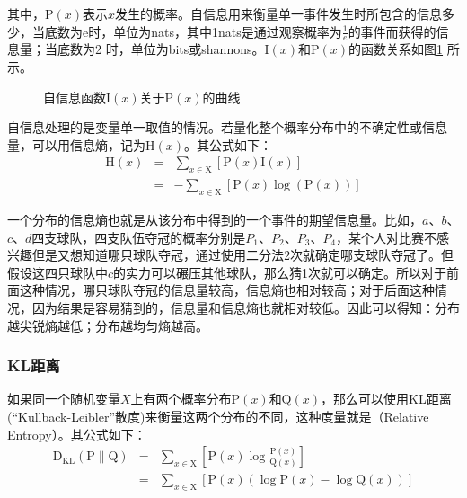 \noindent 其中，$\textrm{P}(x)$表示$x$发生的概率。自信息用来衡量单一事件发生时所包含的信息多少，当底数为e时，单位为nats，其中1nats是通过观察概率为$\frac{1}{e}$的事件而获得的信息量；当底数为2 时，单位为bits或shannons。$\textrm{I}(x)$和$\textrm{P}(x)$的函数关系如图\ref{fig:2-6} 所示。

\begin{figure}[htp]
\centering

\caption{自信息函数$\textrm{I}(x)$关于$\textrm{P}(x)$的曲线}
\label{fig:2-6}
\end{figure}

\parinterval 自信息处理的是变量单一取值的情况。若量化整个概率分布中的不确定性或信息量，可以用信息熵，记为$\textrm{H}(x)$。其公式如下：
\begin{eqnarray}
\textrm{H}(x) & = & \sum_{x \in \textrm{X}}[ \textrm{P}(x) \textrm{I}(x)] \nonumber \\
              & = & - \sum_{x \in \textrm{X} } [\textrm{P}(x)\log(\textrm{P}(x)) ]
\label{eq:2-14}
\end{eqnarray}

\parinterval 一个分布的信息熵也就是从该分布中得到的一个事件的期望信息量。比如，$a$、$b$、$c$、$d$四支球队，四支队伍夺冠的概率分别是$P_1$、$P_2$、$P_3$、$P_4$，某个人对比赛不感兴趣但是又想知道哪只球队夺冠，通过使用二分法2次就确定哪支球队夺冠了。但假设这四只球队中$c$的实力可以碾压其他球队，那么猜1次就可以确定。所以对于前面这种情况，哪只球队夺冠的信息量较高，信息熵也相对较高；对于后面这种情况，因为结果是容易猜到的，信息量和信息熵也就相对较低。因此可以得知：分布越尖锐熵越低；分布越均匀熵越高。


\subsubsection{KL距离}

\parinterval 如果同一个随机变量$X$上有两个概率分布P$(x)$和Q$(x)$，那么可以使用KL距离(``Kullback-Leibler''散度)来衡量这两个分布的不同，这种度量就是{\small{}}（Relative Entropy）。其公式如下：
\begin{eqnarray}
\textrm{D}_{\textrm{KL}}(\textrm{P}\parallel \textrm{Q}) & = & \sum_{x \in \textrm{X}} [ \textrm{P}(x)\log \frac{\textrm{P}(x) }{ \textrm{Q}(x) } ]  \nonumber \\
                                                                                       & = & \sum_{x \in \textrm{X} }[ \textrm{P}(x)(\log\textrm{P}(x)-\log \textrm{Q}(x))]
\label{eq:2-15}
\end{eqnarray}

